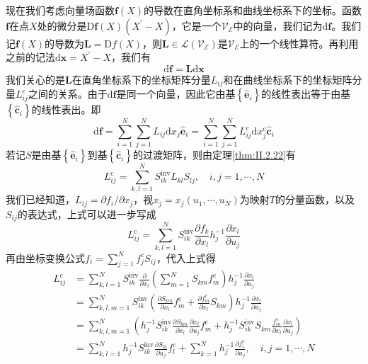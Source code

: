 \documentclass[../main.tex]{subfiles}
\begin{document}
现在我们考虑向量场函数$\mathbf{f}\left(X\right)$的导数在直角坐标系和曲线坐标系下的坐标。函数$\mathbf{f}$在点$X$处的微分是$\mathrm{D}\mathbf{f}\left(X\right)\left(X^\prime-X\right)$，它是一个$\mathcal{V}_\mathcal{E}$中的向量，我们记为$\mathrm{d}\mathbf{f}$。我们记$\mathbf{f}\left(X\right)$的导数为$\mathbf{L}=\mathrm{D}f\left(X\right)$，则$\mathbf{L}\in\mathcal{L}\left(\mathcal{V}_\mathcal{E}\right)$是$\mathcal{V}_\mathcal{E}$上的一个线性算符。再利用之前的记法$\mathrm{d}\mathbf{x}=X^\prime-X$，我们有
\[\mathrm{d}\mathbf{f}=\mathbf{L}\mathrm{d}\mathbf{x}\]
我们关心的是$\mathbf{L}$在直角坐标系下的坐标矩阵分量$L_{ij}$和在曲线坐标系下的坐标矩阵分量$L_{ij}^\mathrm{c}$之间的关系。由于$\mathrm{d}\mathbf{f}$是同一个向量，因此它由基$\left\{\mathbf{\hat{e}}_i\right\}$的线性表出等于由基$\left\{\mathbf{\hat{c}}_i\right\}$的线性表出。即
\[\mathrm{d}\mathbf{f}=\sum_{i=1}^N\sum_{j=1}^N L_{ij}\mathrm{d}x_j\mathbf{\hat{e}}_i=\sum_{i=1}^N\sum_{j=1}^NL_{ij}^\mathrm{c}\mathrm{d}x_j^\mathrm{c}\mathbf{\hat{c}}_i\]
若记$S$是由基$\left\{\mathbf{\hat{e}}_i\right\}$到基$\left\{\mathbf{\hat{c}}_i\right\}$的过渡矩阵，则由定理\ref{thm:II.2.22}有
\[L_{ij}^\mathrm{c}=\sum_{k,l=1}^N S_{ik}^\mathrm{inv}L_{kl}S_{lj},\quad i,j=1,\cdots,N\]
我们已经知道，$L_{ij}=\partial f_i/\partial x_j$，视$x_j=x_j\left(u_1,\cdots,u_N\right)$为映射$T$的分量函数，以及$S_{ij}$的表达式，上式可以进一步写成
\[L_{ij}^\mathrm{c}=\sum_{k,l=1}^NS_{ik}^\mathrm{inv}\frac{\partial f_k}{\partial x_l}h_j^{-1}\frac{\partial x_l}{\partial u_j}\]
再由坐标变换公式$f_i=\sum_{j=1}^N f_j^\mathrm{c}S_{ij}$，代入上式得
\[
    \begin{aligned}
        L_{ij}^\mathrm{c} & =\sum_{k,l=1}^NS_{ik}^\mathrm{inv}\frac{\partial}{\partial x_l}\left(\sum_{m=1}^N S_{km}f_m^\mathrm{c}\right)h_j^{-1}\frac{\partial x_l}{\partial u_j}                                                                                             \\
                          & =\sum_{k,l,m=1}^NS_{ik}^\mathrm{inv}\left(\frac{\partial S_{km}}{\partial x_l}f_m^\mathrm{c}+\frac{\partial f_m^\mathrm{c}}{\partial x_l}S_{km}\right)h_j^{-1}\frac{\partial x_l}{\partial u_j}                                                    \\
                          & =\sum_{k,l,m=1}^N\left(h_j^{-1}S_{ik}^\mathrm{inv}\frac{\partial S_{km}}{\partial x_l}\frac{\partial x_l}{\partial u_j}f_m^\mathrm{c}+h_j^{-1}S_{ik}^\mathrm{inv}S_{km}\frac{f_m^\mathrm{c}}{\partial x_l}\frac{\partial x_l}{\partial u_j}\right) \\
                          & =\sum_{k,l=1}^Nh_j^{-1}S_{ik}^\mathrm{inv}\frac{\partial S_{kl}}{\partial u_j}f_l^\mathrm{c}+\sum_{k=1}^Nh_j^{-1}\frac{\partial f_i^\mathrm{c}}{\partial u_j},\quad i,j=1,\cdots,N
    \end{aligned}
\]
\end{document}
